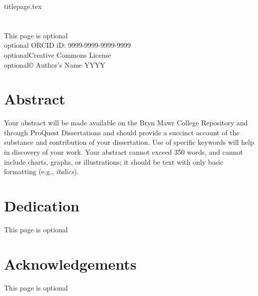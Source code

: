 \documentclass[12pt]{report}
\begin{document}
{titlepage.tex} %
\chapter*{}
\vspace*{\fill}
\begin{center}
\begin{singlespace}
This page is optional\\

optional ORCID iD:  9999-9999-9999-9999\\
optionalCreative Commons License \\
optional© Author's Name YYYY\\
\end{singlespace}
\end{center}
\vspace*{\fill}
\chapter*{Abstract}
\indent \indent Your abstract will be made available on the Bryn Mawr College Repository and
through ProQuest Dissertations and should provide a succinct account of the substance
and contribution of your dissertation. Use of specific keywords will help in discovery of
your work. Your abstract cannot exceed 350 words, and cannot include charts, graphs, or
illustrations; it should be text with only basic formatting (e.g., \textit{italics}).
\setcounter{page}{2}
\chapter*{Dedication}
\begin{center}
    This page is optional
\end{center}
\chapter*{Acknowledgements}
\begin{center}
    This page is optional
\end{center}
\tableofcontents
\newpage
\listoffigures
\newpage
\listoftables
\newpage
\listofappendices
\newpage
{}
\end{document}
